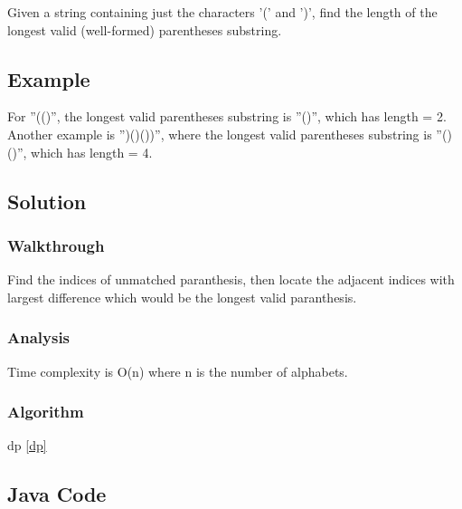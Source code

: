 \documentclass[]{book}
\begin{document}
Given a string containing just the characters '(' and ')', find the length of the longest valid (well-formed)
parentheses substring.

\hypertarget{example-27}{%
\subsection{Example}\label{example-27}}

For ''(()'', the longest valid parentheses substring is ''()'', which has length = 2.
Another example is '')()())'', where the longest valid parentheses substring is ''()()'', which has length = 4.

\hypertarget{solution-22}{%
\subsection{Solution}\label{solution-22}}

\hypertarget{walkthrough-26}{%
\subsubsection{Walkthrough}\label{walkthrough-26}}

Find the indices of unmatched paranthesis, then locate the adjacent indices with largest difference which would be
the longest valid paranthesis.

\hypertarget{analysis-29}{%
\subsubsection{Analysis}\label{analysis-29}}

Time complexity is O(n) where n is the number of alphabets.

\hypertarget{algorithm-29}{%
\subsubsection{Algorithm}\label{algorithm-29}}

dp \ref{dp}

\hypertarget{java-code-25}{%
\subsection{Java Code}\label{java-code-25}}
\end{document}
